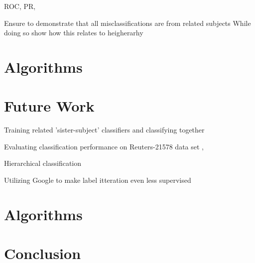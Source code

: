 \documentclass[%
 reprint,
 amsmath,amssymb,
 aps,
]{revtex4-1}
\begin{document}
ROC, PR,

Ensure to demonstrate that all misclassifications are from related subjects
While doing so show how this relates to heigherarhy

\section{\label{sec:level1}Algorithms}


\section{\label{sec:level1}Future Work}


Training related 'sister-subject' classifiers and classifying together

Evaluating classification performance on Reuters-21578 data set \cite{Dumais_et_al}, \cite{Lou_ZincirHeywood}

Hierarchical classification

Utilizing Google to make label itteration even less supervised


\section{\label{sec:level1}Algorithms}


\section{Conclusion}



\end{document}
